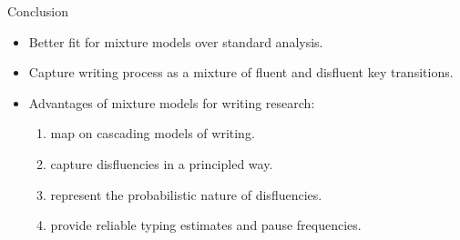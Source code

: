 \begin{frame}{Conclusion}
	\begin{itemize}
		\item Better fit for mixture models over standard analysis.
		\item Capture writing process as a mixture of fluent and disfluent key transitions.
		\item Advantages of mixture models for writing research:
		\begin{enumerate}
			\item map on cascading models of writing.
			\item capture disfluencies in a principled way.
			\item represent the probabilistic nature of disfluencies.
			\item provide reliable typing estimates and pause frequencies.
			
		\end{enumerate}
	\end{itemize}
\end{frame}


\begin{comment}
\begin{frame}{Discussion}
	\begin{itemize}
		\item Our statistical techniques need to align closely with the cognitive process we're trying to understand.
		\item \dots and represent our current understanding of the underlying cognitive process.
		\item To achieve this we need to model the raw data possible rather than summary statistics.
		\item Otherwise we risk incorrect conclusions about our data.
	\end{itemize}	
\end{frame}

\begin{frame}{Prospects}	
	\begin{itemize}
		\item Shiny-app: calculate disfluencies from keystroke data.
		\item Manuscript: extension to autoregression.
		\item Application of models for data in which pause frequencies play a central role: group comparisons, diagnostic tool?
		\item Application picture description data with spelling manipulation.
	\end{itemize}
\end{frame}
\end{comment}